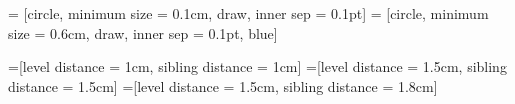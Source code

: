  = [circle, minimum size = 0.1cm, draw, inner sep = 0.1pt]
 = [circle, minimum size = 0.6cm, draw, inner sep = 0.1pt, blue]
            
=[level distance = 1cm, sibling distance = 1cm]
=[level distance = 1.5cm, sibling distance = 1.5cm]
=[level distance = 1.5cm, sibling distance = 1.8cm]


    

